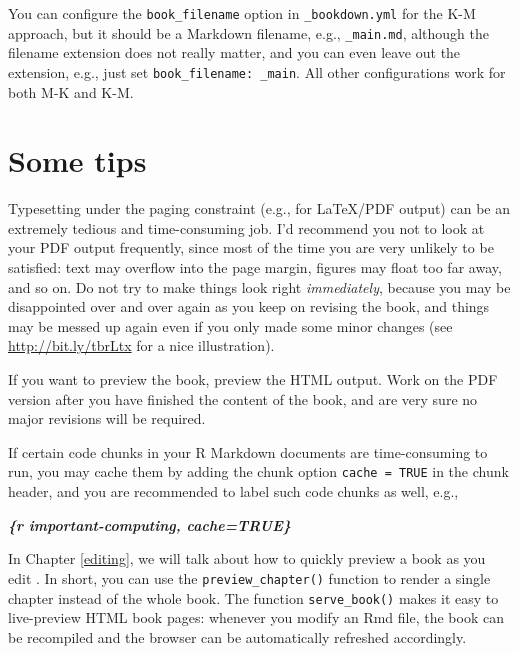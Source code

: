 \documentclass[
  12pt,
]{krantz}
\newenvironment{Shaded}{\begin{snugshade}}{\end{snugshade}}
\newcommand{\InformationTok}[1]{\textcolor[rgb]{0.56,0.35,0.01}{\textbf{\textit{#1}}}}
\theoremstyle{definition}
\theoremstyle{definition}
\theoremstyle{definition}
\theoremstyle{definition}
\theoremstyle{remark}
\begin{document}
You can configure the \texttt{book\_filename} option in \texttt{\_bookdown.yml} for the K-M approach, but it should be a Markdown filename, e.g., \texttt{\_main.md}, although the filename extension does not really matter, and you can even leave out the extension, e.g., just set \texttt{book\_filename:\ \_main}. All other configurations work for both M-K and K-M.

\section{Some tips}\label{some-tips}

Typesetting under the paging constraint (e.g., for LaTeX/PDF output) can be an extremely tedious and time-consuming job. I'd recommend you not to look at your PDF output frequently, since most of the time you are very unlikely to be satisfied: text may overflow into the page margin, figures may float too far away, and so on. Do not try to make things look right \emph{immediately}, because you may be disappointed over and over again as you keep on revising the book, and things may be messed up again even if you only made some minor changes (see \url{http://bit.ly/tbrLtx} for a nice illustration).

If you want to preview the book, preview the HTML output. Work on the PDF version after you have finished the content of the book, and are very sure no major revisions will be required.

If certain code chunks in your R Markdown documents are time-consuming to run, you may cache them by adding the chunk option \texttt{cache\ =\ TRUE} in the chunk header, and you are recommended to label such code chunks as well, e.g.,

\begin{Shaded}
\begin{Highlighting}[]
\InformationTok{\textasciigrave{}\textasciigrave{}\textasciigrave{}\{r important{-}computing, cache=TRUE\}}
\end{Highlighting}
\end{Shaded}

In Chapter \ref{editing}, we will talk about how to quickly preview a book as you edit . In short, you can use the \texttt{preview\_chapter()} function to render a single chapter instead of the whole book. The function \texttt{serve\_book()} makes it easy to live-preview HTML book pages: whenever you modify an Rmd file, the book can be recompiled and the browser can be automatically refreshed accordingly.
\end{document}

